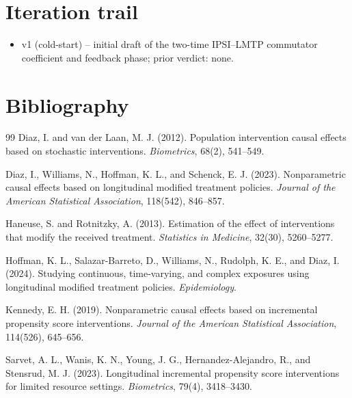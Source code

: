 \documentclass[11pt]{article}
\theoremstyle{definition}
\theoremstyle{plain}
\theoremstyle{remark}
\begin{document}
\section{Iteration trail}
\begin{itemize}[leftmargin=*]
\item v1 (cold-start) -- initial draft of the two-time IPSI--LMTP commutator coefficient and feedback phase; prior verdict: none.
\end{itemize}

\section*{Bibliography}
\begin{thebibliography}{99}
Diaz, I. and van der Laan, M. J. (2012).
\newblock Population intervention causal effects based on stochastic interventions.
\newblock \emph{Biometrics}, 68(2), 541--549.

Diaz, I., Williams, N., Hoffman, K. L., and Schenck, E. J. (2023).
\newblock Nonparametric causal effects based on longitudinal modified treatment policies.
\newblock \emph{Journal of the American Statistical Association}, 118(542), 846--857.

Haneuse, S. and Rotnitzky, A. (2013).
\newblock Estimation of the effect of interventions that modify the received treatment.
\newblock \emph{Statistics in Medicine}, 32(30), 5260--5277.

Hoffman, K. L., Salazar-Barreto, D., Williams, N., Rudolph, K. E., and Diaz, I. (2024).
\newblock Studying continuous, time-varying, and complex exposures using longitudinal modified treatment policies.
\newblock \emph{Epidemiology}.

Kennedy, E. H. (2019).
\newblock Nonparametric causal effects based on incremental propensity score interventions.
\newblock \emph{Journal of the American Statistical Association}, 114(526), 645--656.

Sarvet, A. L., Wanis, K. N., Young, J. G., Hernandez-Alejandro, R., and Stensrud, M. J. (2023).
\newblock Longitudinal incremental propensity score interventions for limited resource settings.
\newblock \emph{Biometrics}, 79(4), 3418--3430.


\end{thebibliography}
\end{document}
